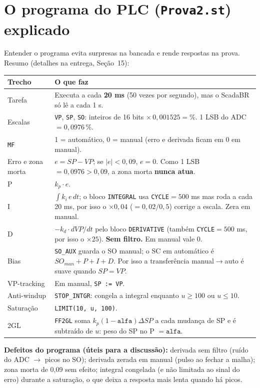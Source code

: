\documentclass[11pt,a4paper]{article}
\begin{document}
\section{O programa do PLC (\texttt{Prova2.st}) explicado}\label{codigoplc}
Entender o programa evita surpresas na bancada e rende respostas na prova. Resumo (detalhes na entrega, Seção~15):
\begin{center}\small\renewcommand{\arraystretch}{1.3}
\begin{longtable}{p{3cm}p{12cm}}
\toprule \textbf{Trecho} & \textbf{O que faz}\\\midrule\endhead
Tarefa & Executa a cada \textbf{20 ms} (50 vezes por segundo), mas o ScadaBR só lê a cada 1 s.\\
Escalas & \texttt{VP}, \texttt{SP}, \texttt{SO}: inteiros de 16 bits $\times\,0{,}001525=\%$. 1 LSB do ADC $=0{,}0976\,\%$.\\
\texttt{MF} & 1 = automático, 0 = manual (erro e derivada ficam em 0 em manual).\\
Erro e zona morta & $e=SP-VP$; se $|e|<0{,}09$, $e=0$. Como 1 LSB $=0{,}0976>0{,}09$, a zona morta \textbf{nunca atua}.\\
P & $k_p\cdot e$.\\
I & $\int k_i\,e\,dt$; o bloco \texttt{INTEGRAL} usa \texttt{CYCLE}$=500$ ms mas roda a cada 20 ms, por isso o $\times0{,}04$ ($=0{,}02/0{,}5$) corrige a escala. Zera em manual.\\
D & $-k_d\cdot dVP/dt$ pelo bloco \texttt{DERIVATIVE} (também \texttt{CYCLE}$=500$ ms, por isso o $\times25$). \textbf{Sem filtro.} Em manual vale 0.\\
Bias & \texttt{SO\_AUX} guarda o SO manual; o SC em automático é $SO_{man}+P+I+D$. Por isso a transferência manual$\to$auto é suave quando $SP=VP$.\\
VP-tracking & Em manual, \texttt{SP := VP}.\\
Anti-windup & \texttt{STOP\_INTGR}: congela a integral enquanto $u\ge100$ ou $u\le10$.\\
Saturação & \texttt{LIMIT(10, u, 100)}.\\
2GL & \texttt{FF2GL} soma $k_p(1-\mathtt{alfa})\Delta SP$ a cada mudança de SP e é subtraído de $u$: peso do SP no P $=\mathtt{alfa}$.\\\bottomrule
\end{longtable}\end{center}
\textbf{Defeitos do programa (úteis para a discussão):} derivada sem filtro (ruído do ADC $\to$ picos no SO); derivada zerada em manual (pulso ao fechar a malha); zona morta de 0,09 sem efeito; integral congelada (e não limitada ao sinal do erro) durante a saturação, o que deixa a resposta mais lenta quando há picos.
\end{document}
